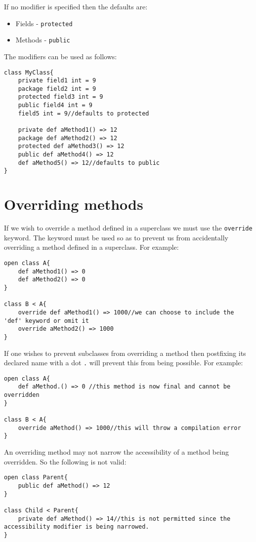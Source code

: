 \documentclass[conc-doc]{subfiles}
\begin{document}
If no modifier is specified then the defaults are:
\begin{itemize}
	\item Fields - \lstinline!protected!
	\item Methods - \lstinline!public!
\end{itemize}

The modifiers can be used as follows:
\begin{lstlisting}
class MyClass{
	private field1 int = 9
	package field2 int = 9
	protected field3 int = 9
	public field4 int = 9
	field5 int = 9//defaults to protected
	
	private def aMethod1() => 12
	package def aMethod2() => 12
	protected def aMethod3() => 12
	public def aMethod4() => 12
	def aMethod5() => 12//defaults to public
}
\end{lstlisting}

\section{Overriding methods}
If we wish to override a method defined in a superclass we must use the \lstinline{override} keyword. The keyword must be used so as to prevent us from accidentally overriding a method defined in a superclass. For example:

\begin{lstlisting}
open class A{
	def aMethod1() => 0
	def aMethod2() => 0
}

class B < A{
	override def aMethod1() => 1000//we can choose to include the 'def' keyword or omit it
	override aMethod2() => 1000
}
\end{lstlisting}

If one wishes to prevent subclasses from overriding a method then postfixing its declared name with a dot \lstinline{.} will prevent this from being possible. For example:

\begin{lstlisting}
open class A{
	def aMethod.() => 0 //this method is now final and cannot be overridden
}

class B < A{
	override aMethod() => 1000//this will throw a compilation error
}
\end{lstlisting}

An overriding method may not narrow the accessibility of a method being overridden. So the following is not valid:

\begin{lstlisting}
open class Parent{
	public def aMethod() => 12
}

class Child < Parent{
	private def aMethod() => 14//this is not permitted since the accessibility modifier is being narrowed.
}
\end{lstlisting}
\end{document}

